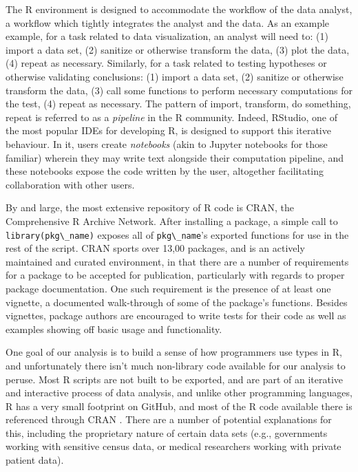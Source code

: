 \documentclass[acmsmall,10pt,review,anonymous]{acmart}\settopmatter{printfolios=true,printccs=false,printacmref=false}
\newcommand{\code}[1]{\lstinline|#1|\xspace}
\begin{document}
The R environment is designed to accommodate the workflow of the data analyst, a workflow which tightly integrates the analyst and the data.
As an example example, for a task related to data visualization, an analyst will need to: (1) import a data set, (2) sanitize or otherwise transform the data, (3) plot the data, (4) repeat as necessary.
Similarly, for a task related to testing hypotheses or otherwise validating conclusions: (1) import a data set, (2) sanitize or otherwise transform the data, (3) call some functions to perform necessary computations for the test, (4) repeat as necessary.
The pattern of import, transform, do something, repeat is referred to as a {\it pipeline} in the R community.
Indeed, RStudio, one of the most popular IDEs for developing R, is designed to support this iterative behaviour.
In it, users create {\it notebooks} (akin to Jupyter notebooks for those familiar) wherein they may write text alongside their computation pipeline, and these notebooks expose the code written by the user, altogether facilitating collaboration with other users.

By and large, the most extensive repository of R code is CRAN, the Comprehensive R Archive Network.
After installing a package, a simple call to \code{library(pkg\_name)} exposes all of \code{pkg\_name}'s exported functions for use in the rest of the script.
CRAN sports over 13,00 packages, and is an actively maintained and curated environment, in that there are a number of requirements for a package to be accepted for publication, particularly with regards to proper package documentation.
One such requirement is the presence of at least one vignette, a documented walk-through of some of the package's functions.
Besides vignettes, package authors are encouraged to write tests for their code as well as examples showing off basic usage and functionality.

One goal of our analysis is to build a sense of how programmers use types in R, and unfortunately there isn't much non-library code available for our analysis to peruse.
Most R scripts are not built to be exported, and are part of an iterative and interactive process of data analysis, and unlike other programming languages, R has a very small footprint on GitHub, and most of the R code available there is referenced through CRAN .
There are a number of potential explanations for this, including the proprietary nature of certain data sets (e.g., governments working with sensitive census data, or medical researchers working with private patient data).
\end{document}
